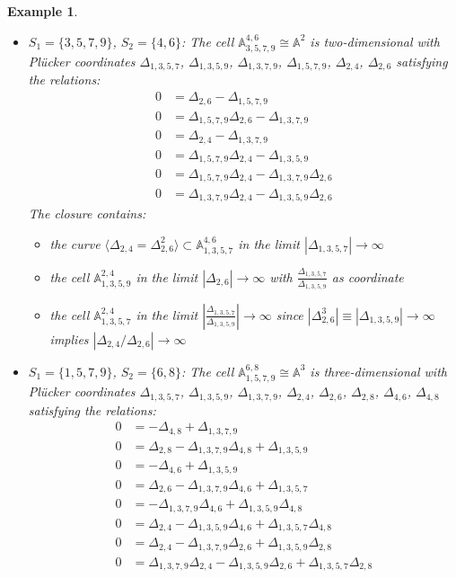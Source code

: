 \documentclass{amsart}
\newtheorem{example}[theorem]{Example}
\numberwithin{equation}{section}
\renewcommand{\AA}{\mathbb{A}}
\begin{document}
\begin{example}
\begin{itemize}
      \item $S_1=\{3,5,7,9\}$, $S_2=\{4,6\}$: The cell $\AA_{3,5,7,9}^{4,6} \cong \AA^2$ is two-dimensional with Pl\"ucker coordinates $\Delta_{1,3,5,7}$, $\Delta_{1,3,5,9}$, $\Delta_{1,3,7,9}$, $\Delta_{1,5,7,9}$, $\Delta_{2,4}$, $\Delta_{2,6}$ satisfying the relations:
        \begin{align*}
          0 &= \Delta_{2,6} - \Delta_{1,5,7,9}\\
          0 &= \Delta_{1,5,7,9}\Delta_{2,6} - \Delta_{1,3,7,9}\\
          0 &= \Delta_{2,4} - \Delta_{1,3,7,9}\\
          0 &= \Delta_{1,5,7,9}\Delta_{2,4} - \Delta_{1,3,5,9}\\
          0 &= \Delta_{1,5,7,9}\Delta_{2,4} - \Delta_{1,3,7,9}\Delta_{2,6}\\
          0 &= \Delta_{1,3,7,9}\Delta_{2,4} - \Delta_{1,3,5,9}\Delta_{2,6}
        \end{align*}
        The closure contains:
        \begin{itemize}
          \item the curve $\langle \Delta_{2,4}=\Delta_{2,6}^2 \rangle \subset \AA_{1,3,5,7}^{4,6}$ in the limit $|\Delta_{1,3,5,7}|\to\infty$
          \item the cell $\AA_{1,3,5,9}^{2,4}$ in the limit $|\Delta_{2,6}|\to\infty$ with $\frac{\Delta_{1,3,5,7}}{\Delta_{1,3,5,9}}$ as coordinate
          \item the cell $\AA_{1,3,5,7}^{2,4}$ in the limit $|\frac{\Delta_{1,3,5,7}}{\Delta_{1,3,5,9}}|\to\infty$ since $|\Delta_{2,6}^3|\equiv|\Delta_{1,3,5,9}|\to\infty$ implies $|\Delta_{2,4}/\Delta_{2,6}|\to\infty$
        \end{itemize}

      \item $S_1=\{1,5,7,9\}$, $S_2=\{6,8\}$: The cell $\AA_{1,5,7,9}^{6,8} \cong \AA^3$ is three-dimensional with Pl\"ucker coordinates $\Delta_{1,3,5,7}$, $\Delta_{1,3,5,9}$, $\Delta_{1,3,7,9}$, $\Delta_{2,4}$, $\Delta_{2,6}$, $\Delta_{2,8}$, $\Delta_{4,6}$, $\Delta_{4,8}$ satisfying the relations:
      \begin{align*}
        0 &= -\Delta_{4,8} + \Delta_{1,3,7,9}\\
        0 &= \Delta_{2,8} - \Delta_{1,3,7,9}\Delta_{4,8} + \Delta_{1,3,5,9}\\
        0 &= -\Delta_{4,6} + \Delta_{1,3,5,9}\\
        0 &= \Delta_{2,6} - \Delta_{1,3,7,9}\Delta_{4,6} + \Delta_{1,3,5,7}\\
        0 &= - \Delta_{1,3,7,9}\Delta_{4,6} + \Delta_{1,3,5,9}\Delta_{4,8}\\
        0 &= \Delta_{2,4} - \Delta_{1,3,5,9}\Delta_{4,6} + \Delta_{1,3,5,7}\Delta_{4,8}\\
        0 &= \Delta_{2,4} - \Delta_{1,3,7,9}\Delta_{2,6} + \Delta_{1,3,5,9}\Delta_{2,8}\\
        0 &= \Delta_{1,3,7,9}\Delta_{2,4} - \Delta_{1,3,5,9}\Delta_{2,6} + \Delta_{1,3,5,7}\Delta_{2,8}
      \end{align*}


\end{itemize}
\end{example}
\end{document}
